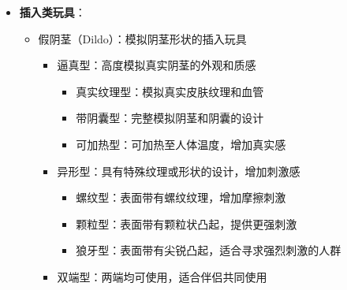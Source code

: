 \documentclass[12pt,UTF8]{ctexbook}
\begin{document}
\begin{itemize}
\begin{itemize}
\begin{itemize}
		\end{itemize}
		\item 按摩棒：较长的振动玩具，可用于身体各部位的按摩和刺激
		\begin{itemize}
			\item 常规按摩棒：直型设计，适合全身按摩
			\item 弯曲按摩棒：带有弯曲角度，适合特定部位刺激
			\item 多头按摩棒：带有多个按摩头的设计，覆盖更大面积
			\item 加热按摩棒：带有加热功能，增加温暖感
		\end{itemize}
		\item 震动环：套在阴茎上的振动玩具，同时刺激男性和女性
		\begin{itemize}
			\item 基础震动环：简单的环形设计，带有单一振动模式
			\item 多频震动环：带有多种振动模式和强度调节
			\item 遥控震动环：可通过遥控器控制，增加互动性
			\item 延时震动环：结合延时功能，延长性爱时间
		\end{itemize}
	\end{itemize}
	\item \textbf{插入类玩具}：
	\begin{itemize}
		\item 假阴茎（Dildo）：模拟阴茎形状的插入玩具
		\begin{itemize}
			\item 逼真型：高度模拟真实阴茎的外观和质感
			\begin{itemize}
				\item 真实纹理型：模拟真实皮肤纹理和血管
				\item 带阴囊型：完整模拟阴茎和阴囊的设计
				\item 可加热型：可加热至人体温度，增加真实感
			\end{itemize}
			\item 异形型：具有特殊纹理或形状的设计，增加刺激感
			\begin{itemize}
				\item 螺纹型：表面带有螺纹纹理，增加摩擦刺激
				\item 颗粒型：表面带有颗粒状凸起，提供更强刺激
				\item 狼牙型：表面带有尖锐凸起，适合寻求强烈刺激的人群
			\end{itemize}
			\item 双端型：两端均可使用，适合伴侣共同使用
			\begin{itemize}

\end{itemize}
\end{itemize}
\end{itemize}
\end{itemize}
\end{document}
